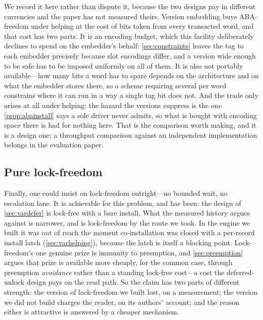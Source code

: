 \documentclass[11pt]{article}
\begin{document}
We record it here rather than dispute it, because the two designs pay in
different currencies and the paper has not measured theirs. Version embedding
buys ABA-freedom under helping at the cost of bits taken from every transacted
word, and that cost has two parts. It is an encoding budget, which this facility
deliberately declines to spend on the embedder's behalf: \cref{sec:constraints}
leaves the tag to each embedder precisely because slot encodings differ, and a
version wide enough to be safe has to be imposed uniformly on all of them. It is
also not portably available---how many bits a word has to spare depends on the
architecture and on what the embedder stores there, so a scheme requiring several
per word constrains where it can run in a way a single tag bit does not. And the
trade only arises at all under helping: the hazard the
versions suppress is the one \cref{prop:abainstall} says a sole driver never
admits, so what is bought with encoding space there is had for nothing here. That
is the comparison worth making, and it is a design one; a throughput comparison
against an independent implementation belongs in the evaluation paper.

\subsection{Pure lock-freedom}
\label{sec:varlockfree}

Finally, one could insist on lock-freedom outright---no bounded wait, no
escalation lane. It is achievable for this problem, and has been: the design of
\cref{sec:vardefer} is lock-free with a bare install. What the measured history
argues against is narrower, and is lock-freedom by the route we took. In the
engine we built it was out of reach the moment co-installation was closed with a
per-record install latch (\cref{sec:varhelping}), because the latch is itself a
blocking point. Lock-freedom's one
genuine prize is immunity to preemption, and \cref{sec:preemption} argues that
prize is available more cheaply, for the common case, through preemption
\emph{avoidance} rather than a standing lock-free cost---a cost the
deferred-unlock design pays on the read path. So the claim has two parts of
different strength: the version of lock-freedom we built lost, on a measurement;
the version we did not build charges the reader, on its authors' account; and
the reason either is attractive is answered by a cheaper mechanism.
\end{document}
